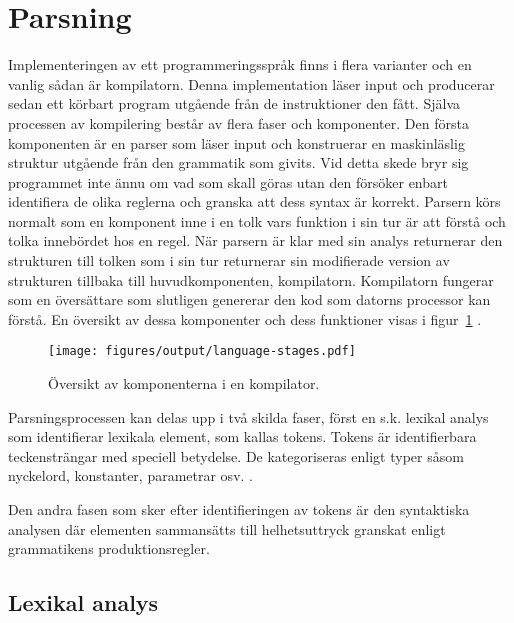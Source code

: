 \section{Parsning}

Implementeringen av ett programmeringsspråk finns i flera varianter och en
vanlig sådan är kompilatorn. Denna implementation läser input och producerar
sedan ett körbart program utgående från de instruktioner den fått.  Själva
processen av kompilering består av flera faser och komponenter. Den första
komponenten är en parser som läser input och konstruerar en maskinläslig
struktur utgående från den grammatik som givits. Vid detta skede bryr sig
programmet inte ännu om vad som skall göras utan den försöker enbart
identifiera de olika reglerna och granska att dess syntax är korrekt. Parsern
körs normalt som en komponent inne i en tolk vars funktion i sin tur är att
förstå och tolka innebördet hos en regel. När parsern är klar med sin analys
returnerar den strukturen till tolken som i sin tur returnerar sin modifierade
version av strukturen tillbaka till huvudkomponenten, kompilatorn. Kompilatorn
fungerar som en översättare som slutligen genererar den kod som datorns
processor kan förstå. En översikt av dessa komponenter och dess funktioner
visas i figur~\ref{fig:compiler} \citep[s. 16]{pt10}.

\begin{figure}[ht]
  \texttt{[image: figures/output/language-stages.pdf]}
  \caption{Översikt av komponenterna i en kompilator.}
  \label{fig:compiler}
\end{figure}

Parsningsprocessen kan delas upp i två skilda faser, först en s.k.
lexikal analys som identifierar lexikala element, som kallas tokens. Tokens
är identifierbara teckensträngar med speciell betydelse. De kategoriseras
enligt typer såsom nyckelord, konstanter, parametrar osv. \citep[s. 6]{aa06}.

Den andra fasen som sker efter identifieringen av tokens är den syntaktiska
analysen där elementen sammansätts till helhetsuttryck granskat enligt
grammatikens produktionsregler.

\subsection{Lexikal analys}

